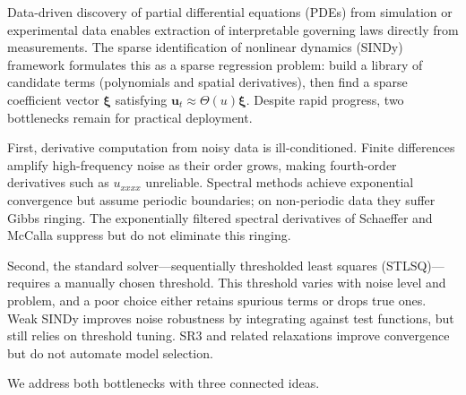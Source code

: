 \documentclass[preprint,12pt]{elsarticle}
\begin{document}
Data-driven discovery of partial differential equations (PDEs) from simulation or experimental data enables extraction of interpretable governing laws directly from measurements. The sparse identification of nonlinear dynamics (SINDy) framework \cite{brunton2016discovering,rudy2017data} formulates this as a sparse regression problem: build a library of candidate terms (polynomials and spatial derivatives), then find a sparse coefficient vector $\boldsymbol{\xi}$ satisfying $\mathbf{u}_t \approx \Theta(u)\boldsymbol{\xi}$. Despite rapid progress, two bottlenecks remain for practical deployment.

First, derivative computation from noisy data is ill-conditioned. Finite differences amplify high-frequency noise as their order grows, making fourth-order derivatives such as $u_{xxxx}$ unreliable. Spectral methods achieve exponential convergence but assume periodic boundaries; on non-periodic data they suffer Gibbs ringing. The exponentially filtered spectral derivatives of Schaeffer and McCalla \cite{schaeffer2017learning} suppress but do not eliminate this ringing.

Second, the standard solver---sequentially thresholded least squares (STLSQ)---requires a manually chosen threshold. This threshold varies with noise level and problem, and a poor choice either retains spurious terms or drops true ones. Weak SINDy \cite{messenger2021weak} improves noise robustness by integrating against test functions, but still relies on threshold tuning. SR3 \cite{kaheman2020sindypi} and related relaxations \cite{champion2020unified,gurevich2019robust} improve convergence but do not automate model selection.

We address both bottlenecks with three connected ideas.
\end{document}

